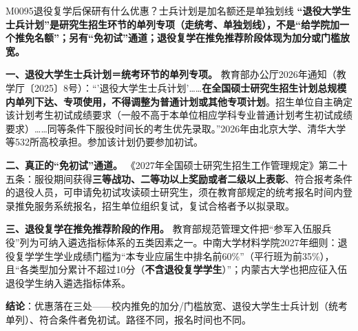 \begin{qa}{M0095}{退役复学后保研有什么优惠？士兵计划是加名额还是单独划线}
\textbf{“退役大学生士兵计划”是研究生招生环节的单列专项（走统考、单独划线），不是“给学院加一个推免名额”；另有“免初试”通道；退役复学在推免推荐阶段体现为加分或门槛放宽。}

\textbf{一、退役大学生士兵计划＝统考环节的单列专项。} 教育部办公厅2026年通知（教学厅〔2025〕8号）：“'退役大学生士兵计划'……\textbf{在全国硕士研究生招生计划总规模内单列下达、专项使用，不得调整为普通计划或其他专项计划}。招生单位自主确定该计划考生初试成绩要求（一般不高于本单位相应学科专业普通计划考生初试成绩要求）……同等条件下服役时间长的考生优先录取。”2026年由北京大学、清华大学等532所高校承担。参加该计划仍要参加初试。

\textbf{二、真正的“免初试”通道。} 《2027年全国硕士研究生招生工作管理规定》第二十五条：服役期间获得\textbf{三等战功、二等功以上奖励或者二级以上表彰}、符合报考条件的退役人员，可申请免初试攻读硕士研究生，须在教育部规定的统考报名时间内登录推免服务系统报名，招生单位组织复试，复试合格者予以拟录取。

\textbf{三、退役复学在推免推荐阶段的作用。} 教育部规范管理文件把“参军入伍服兵役”列为可纳入遴选指标体系的五类因素之一。中南大学材料学院2027年细则：退役复学学生学业成绩门槛为“本专业应届生中排名前60\%”（平行班为前35\%），且“各类型加分累计不超过10分（\textbf{不含退役复学学生}）”；内蒙古大学也把应征入伍退役学生纳入遴选指标体系。

\textbf{结论}：优惠落在三处——校内推免的加分/门槛放宽、退役大学生士兵计划（统考单列）、符合条件者免初试。路径不同，报名时间也不同。
\end{qa}


